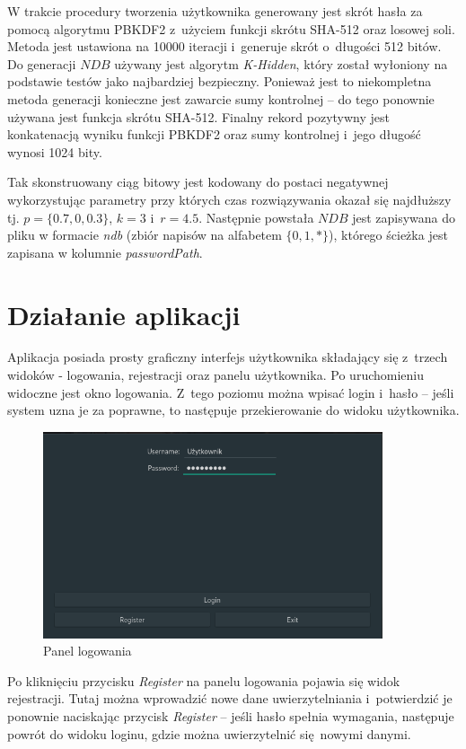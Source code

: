 W trakcie procedury tworzenia użytkownika generowany jest skrót hasła za pomocą algorytmu PBKDF2 z~użyciem funkcji skrótu SHA-512 oraz losowej soli.
Metoda jest ustawiona na 10000 iteracji i~generuje skrót o~długości 512 bitów. 
Do generacji $NDB$ używany jest algorytm \textit{K-Hidden}, który został wyłoniony na podstawie testów jako najbardziej bezpieczny.
Ponieważ jest to niekompletna metoda generacji konieczne jest zawarcie sumy kontrolnej -- do tego ponownie używana jest funkcja skrótu SHA-512.
Finalny rekord pozytywny jest konkatenacją wyniku funkcji PBKDF2 oraz sumy kontrolnej i~jego długość wynosi 1024 bity.

Tak skonstruowany ciąg bitowy jest kodowany do postaci negatywnej wykorzystując parametry przy których czas rozwiązywania okazał się najdłuższy tj. $p = \{0.7, 0, 0.3\}$, $k = 3$ i~$r = 4.5$.
Następnie powstała $NDB$ jest zapisywana do pliku w formacie \textit{ndb} (zbiór napisów na alfabetem $\{0,1,*\}$), którego ścieżka jest zapisana w kolumnie \textit{passwordPath}. 

\section{Działanie aplikacji}

Aplikacja posiada prosty graficzny interfejs użytkownika składający się z~trzech widoków - logowania, rejestracji oraz panelu użytkownika. Po uruchomieniu widoczne jest okno logowania. Z~tego poziomu można wpisać login i~hasło 
-- jeśli system uzna je za poprawne, to następuje przekierowanie do widoku użytkownika. 

\begin{figure}[h]
    \includegraphics[width=10cm]{img/UI/login.png}
    \centering
    \caption{Panel logowania}
    \label{img:gui-login}
\end{figure}

Po kliknięciu przycisku \textit{Register} na panelu logowania pojawia się widok rejestracji. Tutaj można wprowadzić nowe dane uwierzytelniania i~potwierdzić je ponownie naciskając przycisk \textit{Register} -- jeśli hasło spełnia wymagania,
następuje powrót do widoku loginu, gdzie można uwierzytelnić się nowymi danymi.

